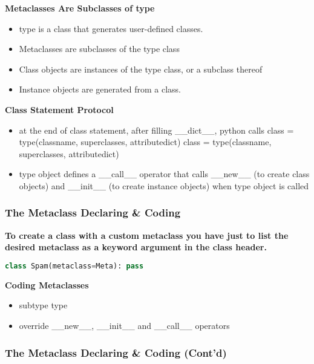 \textbf{Metaclasses Are Subclasses of type}

\begin{itemize}
	\item type is a class that generates user-defined classes.
	\item Metaclasses are subclasses of the type class
	\item Class objects are instances of the type class, or a subclass thereof
	\item Instance objects are generated from a class.
\end{itemize}

\textbf{Class Statement Protocol}

\begin{itemize}
	\item at the end of class statement, after filling \_\_dict\_\_, python calls
		class = type(classname, superclasses, attributedict)
	class = type(classname, superclasses, attributedict)
	\item type object defines a \_\_call\_\_ operator that calls \_\_new\_\_ (to create class objects) and \_\_init\_\_ (to create instance objects) when type object is called
\end{itemize}

\subsubsection{The Metaclass Declaring \& Coding}

\textbf{To create a class with a custom metaclass you have just to list the desired metaclass as a keyword argument in the class header.}

\begin{lstlisting}[language=Python]
class Spam(metaclass=Meta): pass
\end{lstlisting}

\textbf{Coding Metaclasses}
\begin{itemize}
	\item subtype type
	\item override \_\_new\_\_, \_\_init\_\_ and \_\_call\_\_ operators
\end{itemize}

\subsubsection{The Metaclass Declaring & Coding (Cont’d)}


